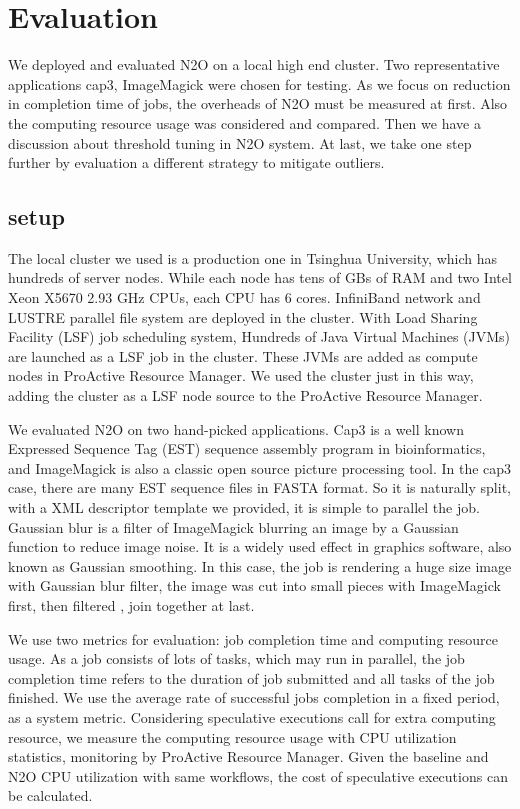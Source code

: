 \section{Evaluation}
We deployed and evaluated N2O on a local high end cluster. Two representative applications cap3, ImageMagick were chosen for testing. As we focus on reduction in completion time of jobs, the overheads of N2O must be measured at first. Also the computing resource usage was considered and compared. Then we have a discussion about threshold tuning in N2O system. At last, we take one step further by evaluation a different strategy to mitigate outliers.

\subsection{setup}

The local cluster we used is a production one in Tsinghua University, which has hundreds of  server nodes. While each node has tens of GBs of RAM and two Intel Xeon X5670 2.93 GHz CPUs, each CPU has 6 cores. InfiniBand network and LUSTRE parallel file system are deployed in the cluster. With Load Sharing Facility (LSF) job scheduling system, Hundreds of Java Virtual Machines (JVMs) are launched as a LSF job in the cluster. These JVMs are added as compute nodes in ProActive Resource Manager. We used the cluster just in this way, adding the cluster as a LSF node source to the ProActive Resource Manager.

We evaluated N2O on two hand-picked applications. Cap3 is a well known Expressed Sequence Tag (EST) sequence assembly program in bioinformatics, and ImageMagick is also a classic open source picture processing tool. In the cap3 case, there are many EST sequence files in FASTA format. So it is naturally split, with a XML descriptor template we provided, it is simple to parallel the job. Gaussian blur is a filter of ImageMagick blurring an image by a Gaussian function to reduce image noise. It is a widely used effect in graphics software, also known as Gaussian smoothing. In this case, the job is rendering a huge size image with Gaussian blur filter, the image was cut into small pieces with ImageMagick first, then filtered , join together at last.

We use two metrics for evaluation: job completion time and computing resource usage. As a job consists of lots of tasks, which may run in parallel, the job completion time refers to the duration of job submitted and all tasks of the job finished. We use the average rate of successful jobs completion in a fixed period, as a system metric. Considering speculative executions call for extra computing resource, we measure the computing resource usage with CPU utilization statistics, monitoring by ProActive Resource Manager. Given the baseline and N2O CPU utilization with same workflows, the cost of speculative executions can be calculated.

